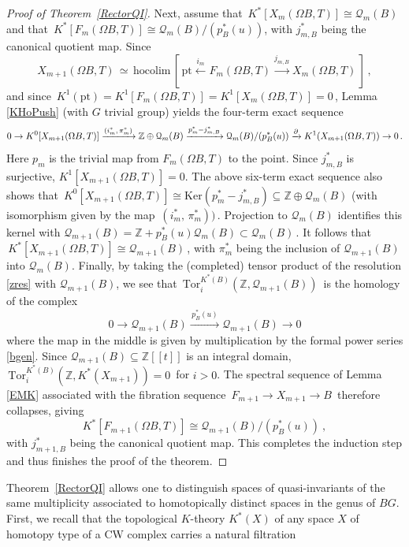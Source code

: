 \documentclass[11pt]{amsart}
\theoremstyle{definition}
\theoremstyle{remark}
\numberwithin{equation}{section}
\newcommand{\Ker}{\mathrm{Ker}}
\newcommand{\hocolim}{\mathrm{hocolim}}
\def\cQ{\mathcal{Q}}
\def\Z{\mathbb{Z}}
\begin{document}
\begin{proof}[Proof of Theorem~\ref{RectorQI}]
Next, assume that $\,K^{\ast}[X_m(\Omega B, T)] \cong \cQ_{m}(B)$ and that $\,K^{\ast}[F_m(\Omega B, T)] \cong \cQ_{m}(B)/(p_B^{\ast}(u))$, with $j_{m,B}^{\ast}$ being the canonical quotient map. Since 
%
$$
X_{m+1}(\Omega B, T) \,\simeq\, \hocolim \,[\, 
\mathrm{pt} \xleftarrow{i_m} F_m(\Omega B, T) \xrightarrow{j_{m,B}} X_m(\Omega B, T)\,]\,,
$$
%
and since $\,K^1(\mathrm{pt})= K^1[F_m(\Omega B, T)] = K^1[X_m(\Omega B, T)]= 0\,$, Lemma \ref{KHoPush} (with $G$ trivial group) yields the four-term exact sequence 
%
$$
0 \to K^0[X_{m+1}(\Omega B, T)] \xrightarrow{(i^{\ast}_m,\, \pi^{\ast}_m)} \Z \oplus \cQ_{m}(B)  \xrightarrow{p^{\ast}_m - j^{\ast}_{m,B}} \cQ_{m}(B)/(p_B^{\ast}(u)) \xrightarrow{\partial}\\
 K^1(X_{m+1}(\Omega B, T))\to 0\,.
$$
%
Here $p_m$ is the trivial map from $F_m(\Omega B, T)$ to the point. Since $j_{m,B}^{\ast}$ is surjective, $K^1[X_{m+1}(\Omega B, T)] = 0$. The above six-term exact sequence also shows that $\,K^0[X_{m+1}(\Omega B, T)] \cong \Ker(p^{\ast}_m -j^\ast_{m,B}) \subseteq \Z \oplus \cQ_{m}(B)$ (with isomorphism given by the map $\,(i^{\ast}_m,\,\pi^{\ast}_m))\,$. Projection to $ \cQ_{m}(B)$ identifies this kernel with $ \cQ_{m+1}(B) =
\Z + p_B^{\ast}(u) \cQ_{m}(B) \subset \cQ_{m}(B)\,$. It follows that $\,K^{\ast}[X_{m+1}(\Omega B, T)] \cong \cQ_{m+1}(B)\,$, with $\pi^{\ast}_m$ being the inclusion of $ \cQ_{m+1}(B)$ into $\cQ_{m}(B) $. Finally, by taking the (completed) tensor product of the resolution \eqref{zres} with $ \cQ_{m+1}(B) $, we see that $\,\mathrm{Tor}^{K^{\ast}(B)}_i(\Z, \cQ_{m+1}(B))\,$ is the homology of the complex
%
$$
0 \to \cQ_{m+1}(B) \xrightarrow{\,p_B^{\ast}(u)\,} \cQ_{m+1}(B) \to 0   
$$
%
where the map in the middle is given by multiplication by
the formal power series \eqref{bgen}.
Since $\cQ_{m+1}(B) \subseteq \Z[[t]]$ is an integral domain, $\,\mathrm{Tor}^{K^{\ast}(B)}_i(\Z, K^{\ast}(X_{m+1})) =0 \,$ for $i>0$. The spectral sequence of Lemma \ref{EMK} associated with the fibration sequence $\,F_{m+1} \to X_{m+1} \to B\,$ therefore collapses, giving 
%
$$
K^{\ast}[F_{m+1}(\Omega B, T)] \cong \cQ_{m+1}(B)/(p_B^{\ast}(u))\ ,  
$$
%
with $j^\ast_{m+1,B}$ being the canonical quotient map. This completes the induction step and thus finishes the proof of the theorem.
\end{proof}
%
Theorem~\ref{RectorQI} allows one to distinguish spaces
of quasi-invariants of the same multiplicity associated to homotopically distinct spaces in the genus of $BG$. First, we recall
that the topological $K$-theory $K^{\ast}(X)$
of any space $X$ of homotopy type of a CW complex carries a natural filtration 
\end{document}
